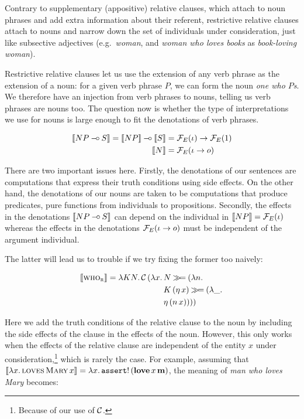 Contrary to supplementary (appositive) relative clauses, which attach to
noun phrases and add extra information about their referent, restrictive
relative clauses attach to nouns and narrow down the set of individuals
under consideration, just like subsective adjectives (e.g.\ \emph{woman},
and \emph{woman who loves books} as \emph{book-loving woman}).

Restrictive relative clauses let us use the extension of any verb phrase as
the extension of a noun: for a given verb phrase $P$, we can form the noun
\emph{one who $P$s}. We therefore have an injection from verb phrases to
nouns, telling us verb phrases are nouns too. The question now is whether
the type of interpretations we use for nouns is large enough to fit the
denotations of verb phrases.

\begin{align*}
  \llbracket NP \mathbin{{-}\mkern-3.5mu{\circ}} S \rrbracket = \llbracket NP \rrbracket \mathbin{{-}\mkern-3.5mu{\circ}} \llbracket S \rrbracket &= \mathcal{F}_E(\iota) \to \mathcal{F}_E(1) \\
  \llbracket N \rrbracket &= \mathcal{F}_E(\iota \to o)
\end{align*}

There are two important issues here. Firstly, the denotations of our
sentences are computations that express their truth conditions using side
effects. On the other hand, the denotations of our nouns are taken to be
computations that produce predicates, pure functions from individuals to
propositions. Secondly, the effects in the denotations $\llbracket NP \mathbin{{-}\mkern-3.5mu{\circ}} S \rrbracket$
can depend on the individual in $\llbracket NP \rrbracket = \mathcal{F}_E(\iota)$ whereas the
effects in the denotations $\mathcal{F}_E(\iota \to o)$ must be independent of the
argument individual.

The latter will lead us to trouble if we try fixing the former too naively:

\begin{align*}
  \llbracket \textsc{who}_{\textsc{r}} \rrbracket = \lambda K N.\, \mathcal{C}\,(\lambda x.\, 
    &N \mathbin{\gg\!=} (\lambda n.\,  \\
    &K\,(\eta\,x) \mathbin{\gg\!=} (\lambda \_.\,  \\
    &\eta\,(n\,x))))
\end{align*}

Here we add the truth conditions of the relative clause to the noun by
including the side effects of the clause in the effects of the
noun. However, this only works when the effects of the relative clause are
independent of the entity $x$ under consideration,\footnote{Because of our
  use of $\mathcal{C}$.} which is rarely the case. For example, assuming that
$\llbracket \lambda x.\, \textsc{loves}\,\textsc{Mary}\,x \rrbracket =
\lambda x.\, \mathtt{assert}!\,(\textbf{love}\,x\,\textbf{m})$, the meaning of
\emph{man who loves Mary} becomes:

